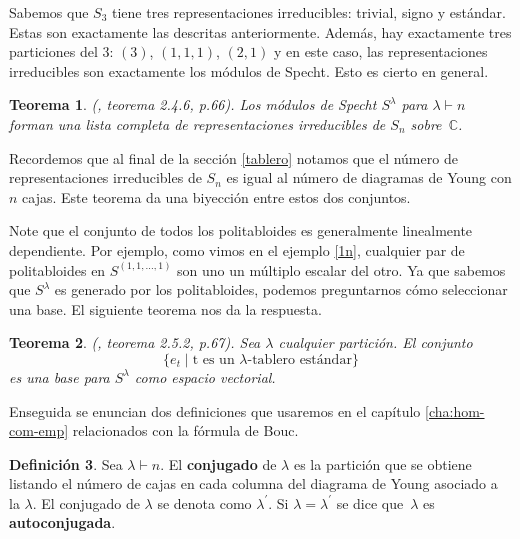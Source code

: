 \documentclass[12pt]{book}
\newtheorem{theorem}{Teorema}[section]
\newtheorem{corollary}[theorem]{Corolario}
\theoremstyle{definition}
\newtheorem{definition}[theorem]{Definición}
\newcounter{in}
\newcounter{ini}
\begin{document}
Sabemos que $S_{3}$ tiene tres representaciones irreducibles: trivial,
signo y estándar. Estas son exactamente las descritas anteriormente. Además,
hay exactamente tres particiones del $3$: $(3)$, $(1,1,1)$,
$(2,1)$ y en este caso, las representaciones irreducibles son
exactamente los módulos de Specht. Esto es cierto en general.

\begin{theorem}{\normalfont(\cite{sagan2001symmetric}, teorema 2.4.6, p.66)}.
  Los módulos de Specht $S^{\lambda}$ para $\lambda\vdash n$ forman
  una lista completa de representaciones irreducibles de $S_{n}$ sobre~$\mathbb{C}$.
  \label{todas-repr-irre}
\end{theorem}
Recordemos que al final de la sección \ref{tablero} notamos que el
número de representaciones irreducibles de $S_{n}$ es igual al número
de diagramas de Young con $n$ cajas. Este teorema da una biyección
entre estos dos conjuntos.

Note que el conjunto de todos los politabloides es generalmente linealmente dependiente. Por
ejemplo, como vimos en el ejemplo \ref{1n}, cualquier par de
politabloides en $S^{(1,1,\ldots,1)}$ son uno un múltiplo escalar del
otro. 
Ya que sabemos que $S^{\lambda}$ es generado por los
politabloides, podemos preguntarnos cómo seleccionar una base. El
siguiente teorema nos da la respuesta.

\begin{theorem}{\normalfont(\cite{sagan2001symmetric}, teorema 2.5.2, p.67)}.
  \label{base-S}
  Sea $\lambda$ cualquier partición. El conjunto
  \begin{equation*}
    \{e_{t}\mid \mbox{t es un $\lambda$-tablero estándar}\}
  \end{equation*}
  es una base para $S^{\lambda}$ como espacio vectorial.
\end{theorem}
Enseguida se enuncian dos definiciones que usaremos en el capítulo \ref{cha:hom-com-emp}
relacionados con la fórmula de Bouc.

\begin{definition}
  Sea $\lambda\vdash n$. El \textbf{conjugado} de $\lambda$ es la
  partición que se obtiene listando el número de cajas en cada columna
  del diagrama de Young asociado a la $\lambda$. El conjugado de
  $\lambda$ se denota como $\lambda^{'}$. Si $\lambda=\lambda^{'}$ se
  dice que~$\lambda$ es \textbf{autoconjugada}.
\end{definition}
\end{document}
